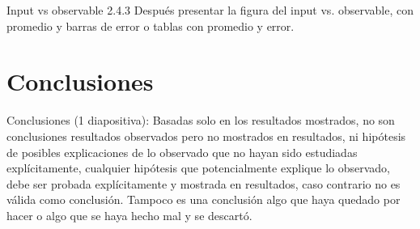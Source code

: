 \documentclass{beamer}
\begin{document}
    \begin{frame}{Input vs observable}
        2.4.3 Después presentar la figura del input vs. observable, con promedio y barras de error o tablas
        con promedio y error.
    \end{frame}


    \section{Conclusiones}

    \begin{frame}{Conclusiones}
        (1 diapositiva): Basadas solo en los resultados mostrados, no son conclusiones
        resultados observados pero no mostrados en resultados, ni hipótesis de posibles explicaciones de
        lo observado que no hayan sido estudiadas explícitamente, cualquier hipótesis que
        potencialmente explique lo observado, debe ser probada explícitamente y mostrada en resultados,
        caso contrario no es válida como conclusión. Tampoco es una conclusión algo que haya quedado
        por hacer o algo que se haya hecho mal y se descartó.
    \end{frame}

%
%
\end{document}
